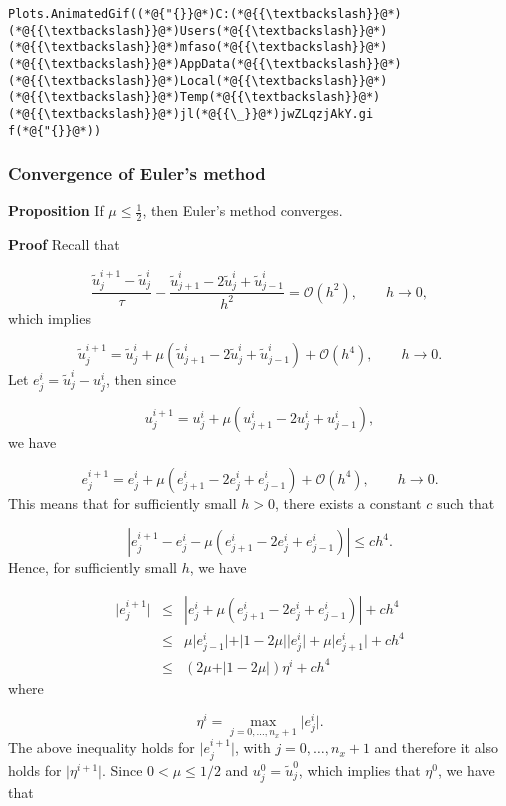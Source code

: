 \documentclass[12pt,landscape]{article}
\begin{document}
{\begin{lstlisting}
Plots.AnimatedGif((*@{"{}}@*)C:(*@{{\textbackslash}}@*)(*@{{\textbackslash}}@*)Users(*@{{\textbackslash}}@*)(*@{{\textbackslash}}@*)mfaso(*@{{\textbackslash}}@*)(*@{{\textbackslash}}@*)AppData(*@{{\textbackslash}}@*)(*@{{\textbackslash}}@*)Local(*@{{\textbackslash}}@*)(*@{{\textbackslash}}@*)Temp(*@{{\textbackslash}}@*)(*@{{\textbackslash}}@*)jl(*@{{\_}}@*)jwZLqzjAkY.gi
f(*@{"{}}@*))
\end{lstlisting}


\subsubsection{Convergence of Euler's method}
\textbf{Proposition} If $\mu \leq \frac{1}{2}$, then Euler's method converges.

\textbf{Proof} Recall that

\[
\frac{\tilde{u}^{i+1}_j - \tilde{u}^i_j}{\tau} - \frac{\tilde{u}^{i}_{j+1} - 2\tilde{u}^i_j + \tilde{u}^i_{j-1}}{h^2}  =  \mathcal{O}(h^2), \qquad h \to 0,
\]
which implies

\[
\tilde{u}^{i+1}_j = \tilde{u}^i_j + \mu \left(\tilde{u}^{i}_{j+1} - 2\tilde{u}^i_j + \tilde{u}^i_{j-1}\right)  +  \mathcal{O}(h^4), \qquad h \to 0.
\]
Let $e^i_j = \tilde{u}^i_j - u^i_j$, then since

\[
u^{i+1}_j = u^i_j + \mu \left( u^{i}_{j+1} - 2u^i_j + u^i_{j-1}  \right),
\]
we have

\[
e^{i+1}_j = e^i_j + \mu \left( e^{i}_{j+1} - 2e^i_j + e^i_{j-1}  \right) + \mathcal{O}(h^4), \qquad h \to 0.
\]
This means that for sufficiently small $h > 0$, there exists a constant $c$ such that 

\[
\left\vert e^{i+1}_j -  e^i_j - \mu \left( e^{i}_{j+1} - 2e^i_j + e^i_{j-1}  \right) \right\vert  \leq ch^4.
\]
Hence, for sufficiently small $h$, we have


\begin{eqnarray*}
\vert e^{i+1}_j \vert &\leq& \left\vert e^i_j + \mu ( e^{i}_{j+1} - 2e^i_j + e^i_{j-1} ) \right\vert + ch^4\\
 & \leq & \mu \vert e^i_{j-1} \vert + \vert 1 - 2\mu \vert \vert e^i_{j} \vert  + \mu \vert e^i_{j+1} \vert + ch^4  \\
 & \leq & \left(2\mu  + \vert 1 - 2\mu \vert \right) \eta^i  + ch^4  
\end{eqnarray*}
where 

\[
\eta^{i} = \max_{j = 0, \ldots, n_x+1}\vert e^i_j \vert.
\]
The above inequality holds for $\vert e^{i+1}_j \vert$, with $j = 0, \ldots, n_x+1$ and therefore it also holds for $\vert  \eta^{i+1} \vert$. Since $0 < \mu \leq 1/2$ and $u^0_j = \tilde{u}^0_j$, which implies that $\eta^0$, we have that

}
\end{document}
